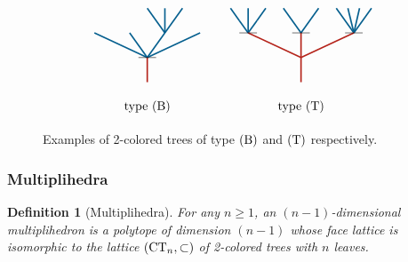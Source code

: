 \documentclass[twoside, 12pt]{amsart}
\newtheorem{definition}{Definition}[section]
\theoremstyle{remark}
\begin{document}
\begin{figure}[h]
\[\vcenter{\hbox{
\begin{tikzpicture}[yscale=0.7,xscale=1]
\draw[very thick, MidnightBlue] (0.5,1)--(0,2);
\draw[very thick, MidnightBlue] (0.5,1)--(0.5,2);
\draw[very thick, MidnightBlue] (0.5,1)--(1,2);
\draw[very thick, MidnightBlue] (0,0)--(0.5, 1); 
\draw[very thick, MidnightBlue] (0,0)--(-0.5, 1); 
\draw[very thick, MidnightBlue] (0,0)--(-1.5,1);
\draw[very thick, MidnightBlue] (0,0)--(1.5, 1);
\draw[very thick, BrickRed] (0,-1)--(0, 0); 
\draw (-0.25,0) to (0.25,0); 
\draw (0,-2) node {type $(\B)$};
\end{tikzpicture}}}\qquad \vcenter{\hbox{
\begin{tikzpicture}[yscale=0.7,xscale=1]
\draw[very thick, MidnightBlue] (-1.5,1)--(-1.5,2);
\draw[very thick, MidnightBlue] (-2,2) -- (-1.75,1.5);
\draw[very thick, MidnightBlue] (-1.25, 1.5) -- (-1,2);
\draw[very thick, MidnightBlue] (-0.5,2) -- (0,1);
\draw[very thick, MidnightBlue] (0,1)--(0.5,2);
\draw[very thick, MidnightBlue] (1.5,1)--(1,2);
\draw[very thick, MidnightBlue] (1.5,1)--(1.33,2);
\draw[very thick, MidnightBlue] (1.5,1)--(1.66,2);
\draw[very thick, MidnightBlue] (1.5,1)--(2,2);
\draw[very thick, MidnightBlue] (-1.5,1)--(-1.75, 1.5); 
\draw[very thick, MidnightBlue] (-1.5,1)--(-1.25, 1.5); 
\draw[very thick, BrickRed] (0,-1)--(0, 1); 
\draw[very thick, BrickRed] (0,0)--(-1.5,1);
\draw[very thick, BrickRed] (0,0)--(1.5, 1);
\draw (-1.75,1) to (-1.25,1); 
\draw (-0.25,1) to (0.25,1); 
\draw (1.25,1) to (1.75,1);
\draw (0,-2) node {type $(\T)$};
\end{tikzpicture}}}\]
\caption{Examples of 2-colored trees of type $(\mathrm{B})$ and $(\mathrm{T})$ respectively. }
\label{Fig5:FacetsColoredTrees}
\end{figure}


\subsubsection{Multiplihedra} \label{sec:multiplihedra}

\begin{definition}[Multiplihedra]
For any $n\geq 1$, an \emph{$(n-1)$-dimensional multiplihedron} is a polytope of dimension $(n-1)$ whose face lattice is isomorphic to the lattice 
$(\mathrm{CT}_{n}, \subset)$
of 2-colored trees with $n$ leaves. 
\end{definition}
\end{document}
